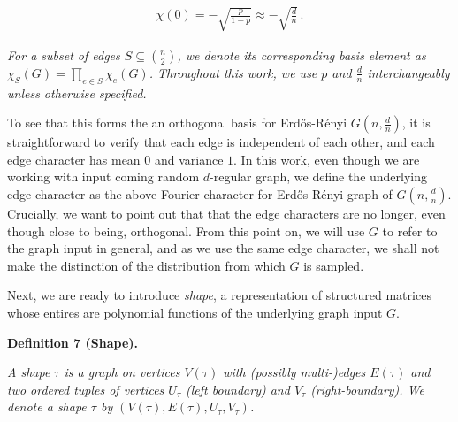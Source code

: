 \[\begin{gathered}
\chi(0)=-\sqrt{\frac{p}{1-p}}\approx-\sqrt{\frac{d}{n}}\,.
\end{gathered}\]


\emph{For a subset of edges $S\subseteq\binom{n}{2}$, we denote its corresponding basis element as $\chi_{S}(G)=\prod_{e\in S}\chi_{e}(G)$. Throughout this work, we use $p$ and $\frac{d}{n}$ interchangeably unless otherwise specified.}\par






To see that this forms the an orthogonal basis for Erdős-Rényi $G(n,\frac{d}{n})$, it is straightforward to verify that each edge is independent of each other, and each edge character has mean $0$ and variance $1$. In this work, even though we are working with input coming random $d$-regular graph, we define the underlying edge-character as the above Fourier character for Erdős-Rényi graph of $G(n,\frac{d}{n})$. Crucially, we want to point out that that the edge characters are no longer, even though close to being, orthogonal. From this point on, we will use $G$ to refer to the graph input in general, and as we use the same edge character, we shall not make the distinction of the distribution from which $G$ is sampled.\par




Next, we are ready to introduce \emph{shape}, a representation of structured matrices whose entires are polynomial functions of the underlying graph input $G$.\par





\par\medskip\noindent\textbf{
\textbf{Definition 7}\textbf{ }(Shape)\textbf{.}
}\par



\emph{A shape $\tau$ is a graph on vertices $V(\tau)$ with (possibly multi-)edges $E(\tau)$ and two ordered tuples of vertices $U_{\tau}$ (left boundary) and $V_{\tau}$ (right-boundary). We denote a shape $\tau$ by $(V(\tau),E(\tau),U_{\tau},V_{\tau})$.}\par






